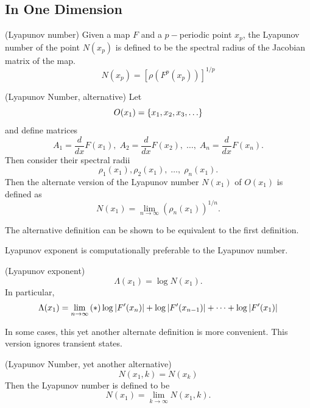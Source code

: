 \documentclass[12pt,twoside,draft]{book}
\begin{document}
\subsection{In One Dimension}
\begin{definition}
  (Lyapunov number)
  Given a map $F$ and a $p-$periodic point $x_p$, the Lyapunov number of the point $N(x_p)$ is
  defined to be the spectral radius of the Jacobian matrix of the map.
  \begin{equation*}
    N(x_p) = \left[ \rho\left( F^p(x_p) \right) \right]^{1/p}
  \end{equation*}
  \label{def:lyapnum}
\end{definition}

\begin{definition}
  (Lyapunov Number, alternative)
  Let
  \begin{equation*}
    O(x_1) = \left \{ x_1, x_2, x_3, \ldots \right \}
  \end{equation*}
  and define matrices
  \begin{equation*}
    A_1 = \frac{d}{dx}F(x_1),\; A_2 = \frac{d}{dx}F(x_2),\; \ldots,\; A_n = \frac{d}{dx}F(x_n).
  \end{equation*}
  Then consider their spectral radii
  \begin{equation*}
    \rho_1(x_1), \rho_2(x_1),\; \ldots,\; \rho_n(x_1).
  \end{equation*}
  Then the alternate version of the Lyapunov number $N(x_1)$ of $O(x_1)$ is defined as 
  \begin{equation*}
    N(x_1) = \lim\limits_{n \to \infty} (\rho_n(x_1))^{1/n}.
  \end{equation*}
\end{definition}
The alternative definition can be shown to be equivalent to the first definition.

Lyapunov exponent is computationally preferable to the Lyapunov number.
\begin{definition}
  (Lyapunov exponent)
  \begin{equation*}
    \Lambda(x_1) = \log N(x_1).
  \end{equation*}
  In particular,
  \begin{equation*}
    \Lambda(x_1) = \lim\limits_{n \to \infty} \left ( * \right ){\log\left | F'(x_n) \right | + \log\left | F'(x_{n-1}) \right | + \cdots + \log\left | F'(x_1) \right |}
  \end{equation*}
\end{definition}

In some cases, this yet another alternate definition is more convenient.
This version ignores transient states.
\begin{definition}
  (Lyapunov Number, yet another alternative)
  \begin{equation*}
    N(x_1, k) = N(x_k)
  \end{equation*}
  Then the Lyapunov number is defined to be
  \begin{equation*}
    N(x_1) = \lim\limits_{k \to \infty} N(x_1,k).
  \end{equation*}
\end{definition}
\end{document}
